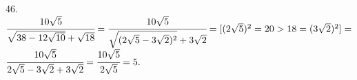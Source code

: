 46.$\cfrac{10\sqrt{5}}{{\sqrt{38-12\sqrt{10}}+\sqrt{18}}}=\cfrac{10\sqrt{5}}{{\sqrt{(2\sqrt{5}-3\sqrt{2})^2}+3\sqrt{2}}}=[(2\sqrt{5})^2=20>18=(3\sqrt{2})^2 ]=$\\$\cfrac{10\sqrt{5}}{2\sqrt{5}-3\sqrt{2}+3\sqrt{2}}=\cfrac{10\sqrt{5}}{2\sqrt{5}}=5.$\\
